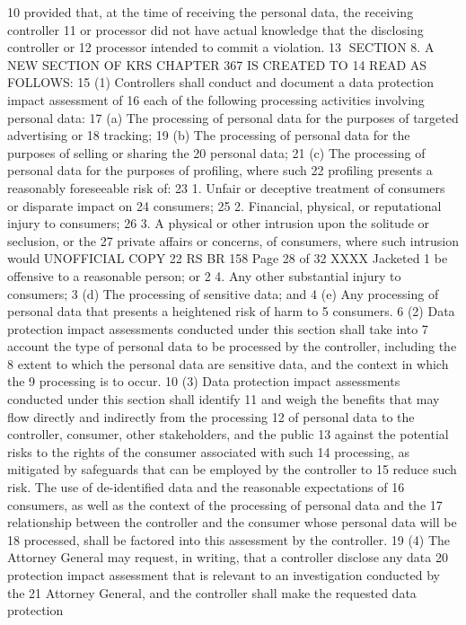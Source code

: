 10 provided that, at the time of receiving the personal data, the receiving controller
11 or processor did not have actual knowledge that the disclosing controller or
12 processor intended to commit a violation.
13 SECTION 8. A NEW SECTION OF KRS CHAPTER 367 IS CREATED TO
14 READ AS FOLLOWS:
15 (1) Controllers shall conduct and document a data protection impact assessment of
16 each of the following processing activities involving personal data:
17 (a) The processing of personal data for the purposes of targeted advertising or
18 tracking;
19 (b) The processing of personal data for the purposes of selling or sharing the
20 personal data;
21 (c) The processing of personal data for the purposes of profiling, where such
22 profiling presents a reasonably foreseeable risk of:
23 1. Unfair or deceptive treatment of consumers or disparate impact on
24 consumers;
25 2. Financial, physical, or reputational injury to consumers;
26 3. A physical or other intrusion upon the solitude or seclusion, or the
27 private affairs or concerns, of consumers, where such intrusion would 
UNOFFICIAL COPY 22 RS BR 158
Page 28 of 32
XXXX Jacketed
1 be offensive to a reasonable person; or
2 4. Any other substantial injury to consumers;
3 (d) The processing of sensitive data; and
4 (e) Any processing of personal data that presents a heightened risk of harm to
5 consumers.
6 (2) Data protection impact assessments conducted under this section shall take into
7 account the type of personal data to be processed by the controller, including the
8 extent to which the personal data are sensitive data, and the context in which the
9 processing is to occur.
10 (3) Data protection impact assessments conducted under this section shall identify
11 and weigh the benefits that may flow directly and indirectly from the processing
12 of personal data to the controller, consumer, other stakeholders, and the public
13 against the potential risks to the rights of the consumer associated with such
14 processing, as mitigated by safeguards that can be employed by the controller to
15 reduce such risk. The use of de-identified data and the reasonable expectations of
16 consumers, as well as the context of the processing of personal data and the
17 relationship between the controller and the consumer whose personal data will be
18 processed, shall be factored into this assessment by the controller.
19 (4) The Attorney General may request, in writing, that a controller disclose any data
20 protection impact assessment that is relevant to an investigation conducted by the
21 Attorney General, and the controller shall make the requested data protection
